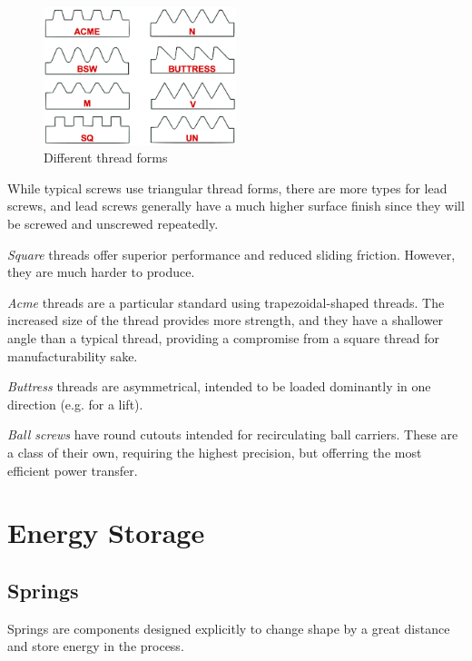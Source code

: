 \begin{figure}[H]
	\includegraphics[width=0.5\textwidth]{imgs/thread_forms.png}
	\caption{Different thread forms}
\end{figure}

While typical screws use triangular thread forms, there are more types for lead screws, and lead screws generally have a much higher surface finish since they will be screwed and unscrewed repeatedly.
\begin{asparaenum}[a)]
\item \textit{Square} threads offer superior performance and reduced sliding friction. However, they are much harder to produce.
\item \textit{Acme} threads are a particular standard using trapezoidal-shaped threads. The increased size of the thread provides more strength, and they have a shallower angle than a typical thread, providing a compromise from a square thread for manufacturability sake.
\item \textit{Buttress} threads are asymmetrical, intended to be loaded dominantly in one direction (e.g. for a lift).
\item \textit{Ball screws} have round cutouts intended for recirculating ball carriers. These are a class of their own, requiring the highest precision, but offerring the most efficient power transfer.
\end{asparaenum}
	
\section{Energy Storage} \label{sec:energy_storage}

\subsection{Springs} \label{subsec:springs} 
	Springs are components designed explicitly to change shape by a great distance and store energy in the process.
	

